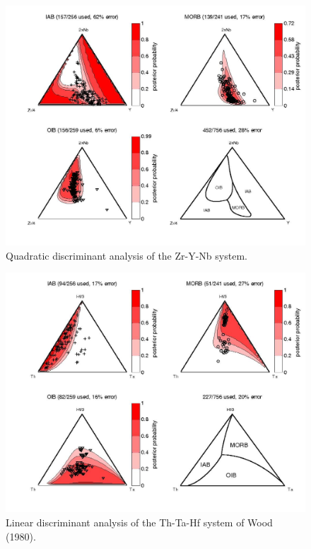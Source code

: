 \begin{figure}[htbp]
  \centering
  \includegraphics[width=600]{figures/Nb_Zr_Y_quad.jpg}
  \caption[Quadratic discriminant analysis of the Zr-Y-Nb system]
{Quadratic discriminant analysis of the Zr-Y-Nb system.}
  \label{fig:Nb_Zr_Y_quad}
\end{figure}

\begin{figure}[htbp]
  \centering
  \includegraphics[width=600]{figures/Th_Ta_Hf_lin.jpg}
  \caption[Linear discriminant analysis of the Th-Ta-Hf system of Wood (1980)]
{Linear discriminant analysis of the Th-Ta-Hf system of Wood (1980).}
  \label{fig:Th_Ta_Hf_lin}
\end{figure}

